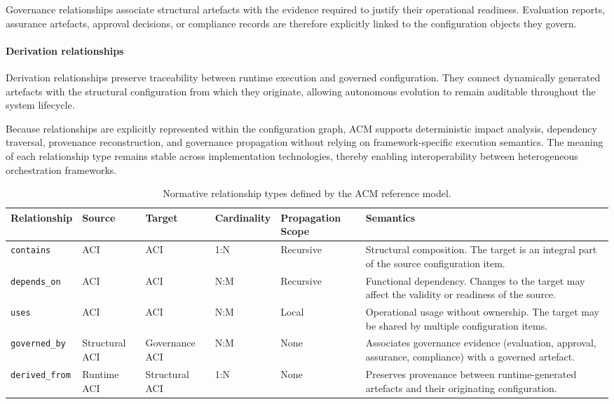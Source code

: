 \documentclass[10pt]{article}
\begin{document}
Governance relationships associate structural artefacts with the evidence required to justify their operational readiness. Evaluation reports, assurance artefacts, approval decisions, or compliance records are therefore explicitly linked to the configuration objects they govern.

\paragraph{Derivation relationships}

Derivation relationships preserve traceability between runtime execution and governed configuration. They connect dynamically generated artefacts with the structural configuration from which they originate, allowing autonomous evolution to remain auditable throughout the system lifecycle.

Because relationships are explicitly represented within the configuration graph, ACM supports deterministic impact analysis, dependency traversal, provenance reconstruction, and governance propagation without relying on framework-specific execution semantics. The meaning of each relationship type remains stable across implementation technologies, thereby enabling interoperability between heterogeneous orchestration frameworks.

\begin{table}[t]
\centering
\caption{Normative relationship types defined by the ACM reference model.}
\label{tab:acm_relationships}
\small
\renewcommand{\arraystretch}{1.15}
\begin{tabular}{p{2.8cm}p{2.3cm}p{2.3cm}p{2.0cm}p{2.2cm}p{4.2cm}}
\toprule
\textbf{Relationship} &
\textbf{Source} &
\textbf{Target} &
\textbf{Cardinality} &
\textbf{Propagation Scope} &
\textbf{Semantics} \\
\midrule

\texttt{contains}
&
ACI
&
ACI
&
1:N
&
Recursive
&
Structural composition. The target is an integral part of the source configuration item.
\\

\texttt{depends\_on}
&
ACI
&
ACI
&
N:M
&
Recursive
&
Functional dependency. Changes to the target may affect the validity or readiness of the source.
\\

\texttt{uses}
&
ACI
&
ACI
&
N:M
&
Local
&
Operational usage without ownership. The target may be shared by multiple configuration items.
\\

\texttt{governed\_by}
&
Structural ACI
&
Governance ACI
&
N:M
&
None
&
Associates governance evidence (evaluation, approval, assurance, compliance) with a governed artefact.
\\

\texttt{derived\_from}
&
Runtime ACI
&
Structural ACI
&
1:N
&
None
&
Preserves provenance between runtime-generated artefacts and their originating configuration.
\\

\bottomrule
\end{tabular}
\end{table}
\end{document}
